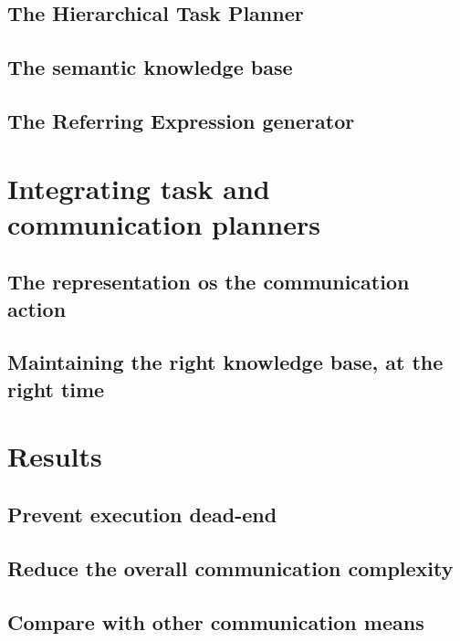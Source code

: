 \subsection{The Hierarchical Task Planner}

\subsection{The semantic knowledge base}

\subsection{The Referring Expression generator}


\section{Integrating task and communication planners}

\subsection{The representation os the communication action}

\subsection{Maintaining the right knowledge base, at the right time}


\section{Results}

\subsection{Prevent execution dead-end}

\subsection{Reduce the overall communication complexity}

\subsection{Compare with other communication means}